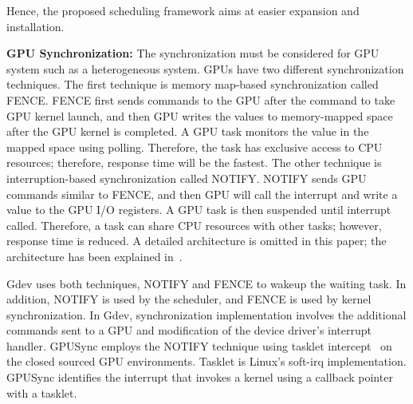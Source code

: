 Hence, the proposed scheduling framework aims at easier expansion and installation.

\textbf{GPU Synchronization:}
The synchronization must be considered for GPU system such as a heterogeneous system.
GPUs have two different synchronization techniques.
The first technique is memory map-based synchronization called FENCE.
FENCE first sends commands to the GPU after the command to take GPU kernel launch,
and then GPU writes the values to memory-mapped space after the GPU kernel is completed.
A GPU task monitors the value in the mapped space using polling.
Therefore, the task has exclusive access to CPU resources; therefore, response time will be the fastest.
The other technique is interruption-based synchronization called NOTIFY.
NOTIFY sends GPU commands similar to FENCE,
and then GPU will call the interrupt and write a value to the GPU I/O registers.
A GPU task is then suspended until interrupt called.
Therefore, a task can share CPU resources with other tasks; however, response time is reduced.
A detailed architecture is omitted in this paper;
the architecture has been explained in~\cite{kato:timegraph, kato:gdev, fujii:apsys2013}.

Gdev uses both techniques, NOTIFY and FENCE to wakeup the waiting task.
In addition, NOTIFY is used by the scheduler, and FENCE is used by kernel synchronization.
In Gdev, synchronization implementation involves the additional commands sent to a GPU and modification of the device driver’s interrupt handler.
GPUSync employs the NOTIFY technique using tasklet intercept~\cite{elliott2012robust} on the closed sourced GPU environments.
Tasklet is Linux’s soft-irq implementation.
GPUSync identifies the interrupt that invokes a kernel using a callback pointer with a tasklet.

